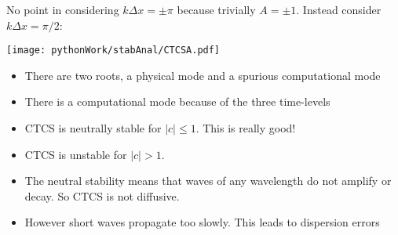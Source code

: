 No point in considering $k\Delta x=\pm\pi$ because trivially $A=\pm 1$. Instead consider $k\Delta x=\pi/2$:

\begin{minipage}{0.4\linewidth}
\texttt{[image: pythonWork/stabAnal/CTCSA.pdf]}
\end{minipage}
\begin{minipage}{0.58\linewidth}
\begin{itemize}\raggedright
\item There are two roots, a physical mode and a spurious computational mode
\item There is a computational mode because of the three time-levels
\item CTCS is neutrally stable for $|c|\le 1$. This is really good!
\item CTCS is unstable for $|c|>1$.
\item The neutral stability means that waves of any wavelength do not amplify or decay. So CTCS is not diffusive.
\item However short waves propagate too slowly. This leads to dispersion errors
\end{itemize}
\end{minipage}

